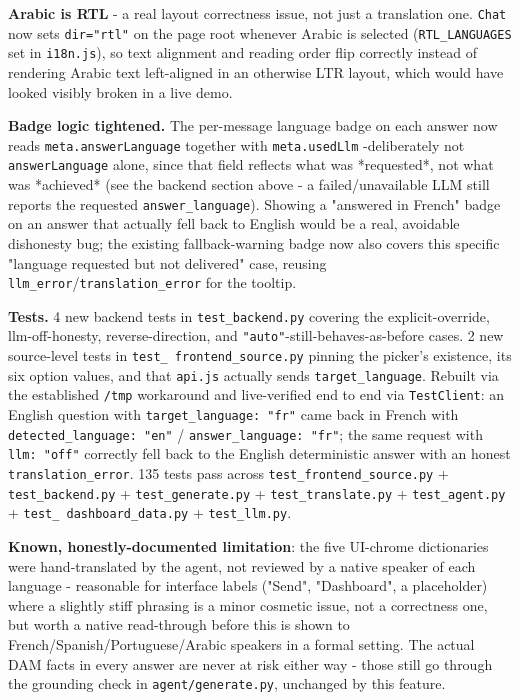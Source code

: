 \textbf{Arabic is RTL} - a real layout correctness issue, not just a translation one. \texttt{Chat} now sets \texttt{dir="rtl"} on the page root whenever Arabic is selected (\texttt{RTL\_\allowbreak{}LANGUAGES} set in \texttt{i18n.js}), so text alignment and reading order flip correctly instead of rendering Arabic text left-aligned in an otherwise LTR layout, which would have looked visibly broken in a live demo.

\textbf{Badge logic tightened.} The per-message language badge on each answer now reads \texttt{meta.answerLanguage} together with \texttt{meta.usedLlm} -deliberately not \texttt{answerLanguage} alone, since that field reflects what was *requested*, not what was *achieved* (see the backend section above - a failed/unavailable LLM still reports the requested \texttt{answer\_\allowbreak{}language}). Showing a "answered in French" badge on an answer that actually fell back to English would be a real, avoidable dishonesty bug; the existing fallback-warning badge now also covers this specific "language requested but not delivered" case, reusing \texttt{llm\_\allowbreak{}error}/\texttt{translation\_\allowbreak{}error} for the tooltip.

\textbf{Tests.} 4 new backend tests in \texttt{test\_\allowbreak{}backend.py} covering the explicit-override, llm-off-honesty, reverse-direction, and \texttt{"auto"}-still-behaves-as-before cases. 2 new source-level tests in \texttt{test\_\allowbreak{} frontend\_\allowbreak{}source.py} pinning the picker's existence, its six option values, and that \texttt{api.js} actually sends \texttt{target\_\allowbreak{}language}. Rebuilt via the established \texttt{/\allowbreak{}tmp} workaround and live-verified end to end via \texttt{TestClient}: an English question with \texttt{target\_\allowbreak{}language: "fr"} came back in French with \texttt{detected\_\allowbreak{}language: "en"} / \texttt{answer\_\allowbreak{}language: "fr"}; the same request with \texttt{llm: "off"} correctly fell back to the English deterministic answer with an honest \texttt{translation\_\allowbreak{}error}. 135 tests pass across \texttt{test\_\allowbreak{}frontend\_\allowbreak{}source.py} + \texttt{test\_\allowbreak{}backend.py} + \texttt{test\_\allowbreak{}generate.py} + \texttt{test\_\allowbreak{}translate.py} + \texttt{test\_\allowbreak{}agent.py} + \texttt{test\_\allowbreak{} dashboard\_\allowbreak{}data.py} + \texttt{test\_\allowbreak{}llm.py}.

\textbf{Known, honestly-documented limitation}: the five UI-chrome dictionaries were hand-translated by the agent, not reviewed by a native speaker of each language - reasonable for interface labels ("Send", "Dashboard", a placeholder) where a slightly stiff phrasing is a minor cosmetic issue, not a correctness one, but worth a native read-through before this is shown to French/Spanish/Portuguese/Arabic speakers in a formal setting. The actual DAM facts in every answer are never at risk either way - those still go through the grounding check in \texttt{agent/\allowbreak{}generate.py}, unchanged by this feature.

